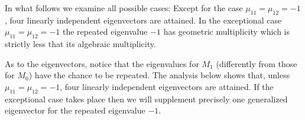\documentclass[11pt]{article}
\theoremstyle{remark}
\begin{document}

In what follows we examine all possible cases:  Except for the case $\mu_{11}=\mu_{12}=-1$, four linearly independent eigenvectors are attained.
In the exceptional case $\mu_{11}=\mu_{12}=-1$ the repeated eigenvalue $-1$ has geometric multiplicity which is strictly less that its  algebraic multiplicity.

As to the eigenvectors, notice that the eigenvalues for $M_1$  (differently from those for $M_0$) have the chance to be repeated. The analysis below
shows  that, unless $\mu_{11}=\mu_{12}=-1$, four linearly independent eigenvectors are attained. If the exceptional case takes place then
we will supplement precisely one generalized eigenvector for the repeated eigenvalue $-1$.
\end{document}
